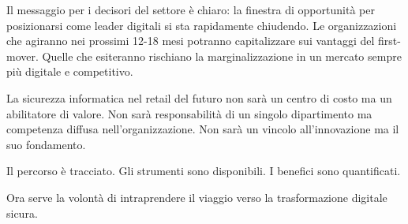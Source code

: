 Il messaggio per i decisori del settore è chiaro: la finestra di opportunità per posizionarsi come leader digitali si sta rapidamente chiudendo. Le organizzazioni che agiranno nei prossimi 12-18 mesi potranno capitalizzare sui vantaggi del first-mover. Quelle che esiteranno rischiano la marginalizzazione in un mercato sempre più digitale e competitivo.

La sicurezza informatica nel retail del futuro non sarà un centro di costo ma un abilitatore di valore. Non sarà responsabilità di un singolo dipartimento ma competenza diffusa nell'organizzazione. Non sarà un vincolo all'innovazione ma il suo fondamento.

Il percorso è tracciato. Gli strumenti sono disponibili. I benefici sono quantificati. 

Ora serve la volontà di intraprendere il viaggio verso la trasformazione digitale sicura.


